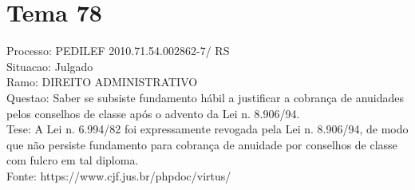 \documentclass[12pt]{article}
\begin{document}
\section*{Tema 78}
Processo: PEDILEF 2010.71.54.002862-7/ RS\\
Situacao: Julgado\\
Ramo: DIREITO ADMINISTRATIVO\\
Questao: Saber se subsiste fundamento hábil a justificar a cobrança de anuidades pelos conselhos de classe após o advento da Lei n. 8.906/94.\\
Tese: A Lei n. 6.994/82 foi expressamente revogada pela Lei n. 8.906/94, de modo que não persiste fundamento para cobrança de anuidade por conselhos de classe com fulcro em tal diploma.\\
Fonte: https://www.cjf.jus.br/phpdoc/virtus/
\end{document}
